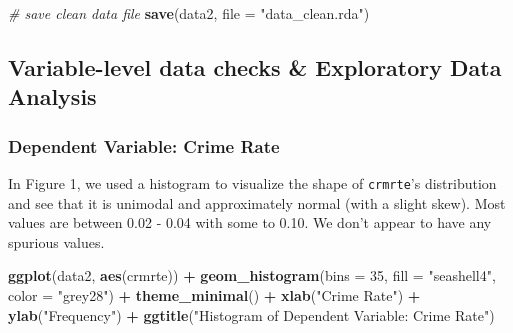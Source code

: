 \documentclass[]{article}
\newenvironment{Shaded}{\begin{snugshade}}{\end{snugshade}}
\newcommand{\CommentTok}[1]{\textcolor[rgb]{0.56,0.35,0.01}{\textit{#1}}}
\newcommand{\DataTypeTok}[1]{\textcolor[rgb]{0.13,0.29,0.53}{#1}}
\newcommand{\DecValTok}[1]{\textcolor[rgb]{0.00,0.00,0.81}{#1}}
\newcommand{\FloatTok}[1]{\textcolor[rgb]{0.00,0.00,0.81}{#1}}
\newcommand{\KeywordTok}[1]{\textcolor[rgb]{0.13,0.29,0.53}{\textbf{#1}}}
\newcommand{\NormalTok}[1]{#1}
\newcommand{\OperatorTok}[1]{\textcolor[rgb]{0.81,0.36,0.00}{\textbf{#1}}}
\newcommand{\StringTok}[1]{\textcolor[rgb]{0.31,0.60,0.02}{#1}}
\begin{document}
\begin{Shaded}
\end{Shaded}

\begin{Shaded}
\begin{Highlighting}[]
\CommentTok{# save clean data file }
\KeywordTok{save}\NormalTok{(data2, }\DataTypeTok{file =} \StringTok{"data_clean.rda"}\NormalTok{)}
\end{Highlighting}
\end{Shaded}

\hypertarget{variable-level-data-checks-exploratory-data-analysis}{%
\subsection{Variable-level data checks \& Exploratory Data
Analysis}\label{variable-level-data-checks-exploratory-data-analysis}}

\hypertarget{dependent-variable-crime-rate}{%
\subsubsection{Dependent Variable: Crime
Rate}\label{dependent-variable-crime-rate}}

In Figure 1, we used a histogram to visualize the shape of
\texttt{crmrte}'s distribution and see that it is unimodal and
approximately normal (with a slight skew). Most values are between 0.02
- 0.04 with some to 0.10. We don't appear to have any spurious values.

\begin{Shaded}
\begin{Highlighting}[]
\KeywordTok{ggplot}\NormalTok{(data2, }\KeywordTok{aes}\NormalTok{(crmrte)) }\OperatorTok{+}
\StringTok{  }\KeywordTok{geom_histogram}\NormalTok{(}\DataTypeTok{bins =} \DecValTok{35}\NormalTok{, }\DataTypeTok{fill =} \StringTok{"seashell4"}\NormalTok{, }\DataTypeTok{color =} \StringTok{"grey28"}\NormalTok{) }\OperatorTok{+}
\StringTok{  }\KeywordTok{theme_minimal}\NormalTok{() }\OperatorTok{+}
\StringTok{  }\KeywordTok{xlab}\NormalTok{(}\StringTok{"Crime Rate"}\NormalTok{) }\OperatorTok{+}
\StringTok{  }\KeywordTok{ylab}\NormalTok{(}\StringTok{"Frequency"}\NormalTok{) }\OperatorTok{+}
\StringTok{  }\KeywordTok{ggtitle}\NormalTok{(}\StringTok{"Histogram of Dependent Variable: Crime Rate"}\NormalTok{)}
\end{Highlighting}
\end{Shaded}
\end{document}
